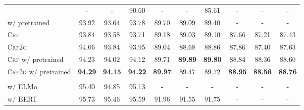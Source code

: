 \begin{table*}[tb]
\begin{tabularx}{\textwidth}{lccccccccc}
        \cite{vilares-etal-2019-better}                 & -                        & -                          & 90.60                    & -                        & -                        & 85.61                    & -              & -              & -              \\
        \cite{zhou-zhao-2019-head} w/ pretrained        & 93.92                    & 93.64                      & 93.78                    & 89.70                    & 89.09                    & 89.40                    & -              & -              & -              \\[3pt]
        \textsc{Crf}                                    & 93.84                    & 93.58                      & 93.71                    & 89.18                    & 89.03                    & 89.10                    & 87.66          & 87.21          & 87.43          \\
        \textsc{Crf2o}                                  & 94.06                    & 93.84                      & 93.95                    & 89.04                    & 88.68                    & 88.86                    & 87.86          & 87.40          & 87.63          \\
        \textsc{Crf} w/ pretrained                      & 94.23                    & 94.02                      & 94.12                    & 89.71                    & \textbf{89.89}           & \textbf{89.80}           & 88.84          & 88.36          & 88.60          \\
        \textsc{Crf2o} w/ pretrained                    & \textbf{94.29}           & \textbf{94.15}             & \textbf{94.22}           & \textbf{89.97}           & 89.47                    & 89.72                    & \textbf{88.95} & \textbf{88.56} & \textbf{88.76} \\[1pt]
        \midrule
        \\[-20pt]
        \cite{kitaev-klein-2018-constituency} w/ ELMo   & 95.40                    & 94.85                      & 95.13                    & -                        & -                        & -                        & -              & -              & -              \\
        \cite{kitaev-etal-2019-multilingual} w/ BERT    & 95.73                    & 95.46                      & 95.59                    & 91.96                    & 91.55                    & 91.75                    & -              & -              & -              \\[3pt]

\end{tabularx}
\end{table*}
